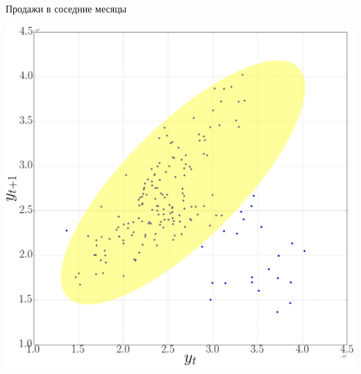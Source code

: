 \documentclass[9pt,pdf,utf8,hyperref={unicode},aspectratio=169]{beamer}
\begin{document}
\begin{frame}{Продажи в соседние месяцы}
	\begin{center}
		\includegraphics[height=0.6\textheight]{wine5.png}
	\end{center}
\end{frame}
\end{document}
